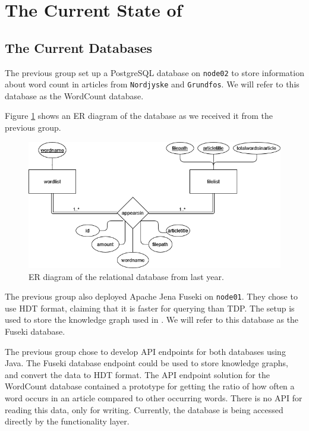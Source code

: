 \section{The Current State of \knox{}} \label{currentState}





\subsection{The Current \knox{} Databases}
The previous group set up a PostgreSQL database on \texttt{node02} to store information about word count in articles from \texttt{Nordjyske} and \texttt{Grundfos}. We will refer to this database as the WordCount database.

Figure \ref{olddatabase} shows an ER diagram of the database as we received it from the previous group.

\begin{figure}[h]
    \centering
    \includegraphics[width=\linewidth]{Images/old_db_er_diagram.png}
    \caption{ER diagram of the relational database from last year.}
    \label{olddatabase}
\end{figure}


The previous group also deployed Apache Jena Fuseki on \texttt{node01}. They chose to use HDT format, claiming that it is faster for querying than TDP\cite{knox2020}. 
The setup is used to store the knowledge graph used in \knox{}.
We will refer to this database as the Fuseki database. 

The previous group chose to develop API endpoints for both databases using Java.
The Fuseki database endpoint could be used to store knowledge graphs, and convert the data to HDT format. The API endpoint solution for the WordCount database contained a prototype for getting the ratio of how often a word occurs in an article compared to other occurring words.
There is no API for reading this data, only for writing. Currently, the database is being accessed directly by the functionality layer. 

